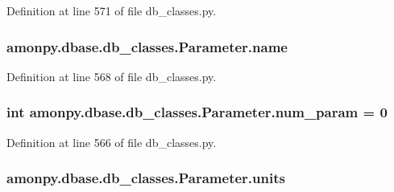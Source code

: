 Definition at line 571 of file db\-\_\-classes.\-py.

\hypertarget{classamonpy_1_1dbase_1_1db__classes_1_1_parameter_a0578aa061ddcf50100cdcbb3851b4c8d}{
\subsubsection[{name}]{\setlength{\rightskip}{0pt plus 5cm}amonpy.\-dbase.\-db\-\_\-classes.\-Parameter.\-name}}\label{classamonpy_1_1dbase_1_1db__classes_1_1_parameter_a0578aa061ddcf50100cdcbb3851b4c8d}


Definition at line 568 of file db\-\_\-classes.\-py.

\hypertarget{classamonpy_1_1dbase_1_1db__classes_1_1_parameter_a505d26cebffda6dbddfb2366052606e2}{
\subsubsection[{num\-\_\-param}]{\setlength{\rightskip}{0pt plus 5cm}int amonpy.\-dbase.\-db\-\_\-classes.\-Parameter.\-num\-\_\-param = 0\hspace{0.3cm}{\ttfamily [static]}}}\label{classamonpy_1_1dbase_1_1db__classes_1_1_parameter_a505d26cebffda6dbddfb2366052606e2}


Definition at line 566 of file db\-\_\-classes.\-py.

\hypertarget{classamonpy_1_1dbase_1_1db__classes_1_1_parameter_aafe3f971978610b9e6a29a9853c71c61}{
\subsubsection[{units}]{\setlength{\rightskip}{0pt plus 5cm}amonpy.\-dbase.\-db\-\_\-classes.\-Parameter.\-units}}\label{classamonpy_1_1dbase_1_1db__classes_1_1_parameter_aafe3f971978610b9e6a29a9853c71c61}


